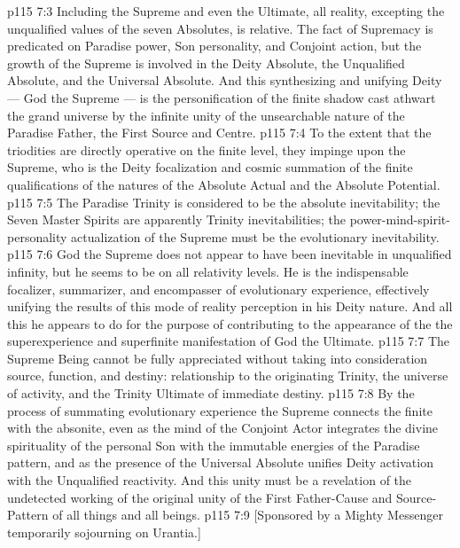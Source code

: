 \vs p115 7:3 \pc Including the Supreme and even the Ultimate, all reality, excepting the unqualified values of the seven Absolutes, is relative. The fact of Supremacy is predicated on Paradise power, Son personality, and Conjoint action, but the growth of the Supreme is involved in the Deity Absolute, the Unqualified Absolute, and the Universal Absolute. And this synthesizing and unifying Deity --- God the Supreme --- is the personification of the finite shadow cast athwart the grand universe by the infinite unity of the unsearchable nature of the Paradise Father, the First Source and Centre.
\vs p115 7:4 To the extent that the triodities are directly operative on the finite level, they impinge upon the Supreme, who is the Deity focalization and cosmic summation of the finite qualifications of the natures of the Absolute Actual and the Absolute Potential.
\vs p115 7:5 \pc The Paradise Trinity is considered to be the absolute inevitability; the Seven Master Spirits are apparently Trinity inevitabilities; the power\hyp{}mind\hyp{}spirit\hyp{}personality actualization of the Supreme must be the evolutionary inevitability.
\vs p115 7:6 God the Supreme does not appear to have been inevitable in unqualified infinity, but he seems to be on all relativity levels. He is the indispensable focalizer, summarizer, and encompasser of evolutionary experience, effectively unifying the results of this mode of reality perception in his Deity nature. And all this he appears to do for the purpose of contributing to the appearance of the  the superexperience and superfinite manifestation of God the Ultimate.
\vs p115 7:7 The Supreme Being cannot be fully appreciated without taking into consideration source, function, and destiny: relationship to the originating Trinity, the universe of activity, and the Trinity Ultimate of immediate destiny.
\vs p115 7:8 By the process of summating evolutionary experience the Supreme connects the finite with the absonite, even as the mind of the Conjoint Actor integrates the divine spirituality of the personal Son with the immutable energies of the Paradise pattern, and as the presence of the Universal Absolute unifies Deity activation with the Unqualified reactivity. And this unity must be a revelation of the undetected working of the original unity of the First Father\hyp{}Cause and Source\hyp{}Pattern of all things and all beings.
\vsetoff
\vs p115 7:9 [Sponsored by a Mighty Messenger temporarily sojourning on Urantia.]
\quizlink
